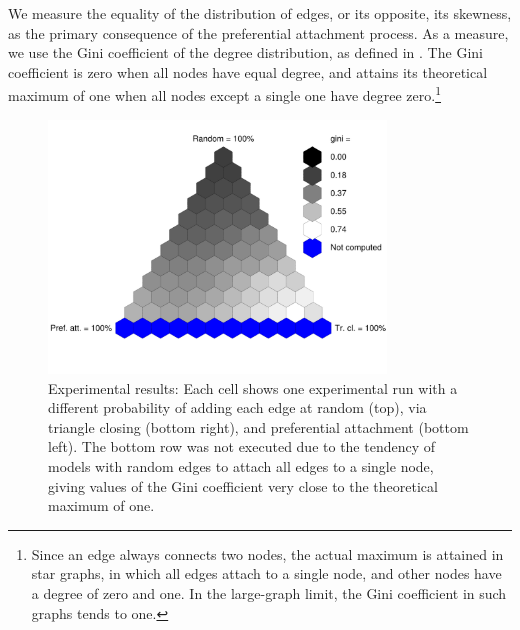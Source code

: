 \documentclass{jimis-final-en}
\begin{document}
We measure the equality of the distribution of edges, or its opposite,
its skewness, as the primary consequence of the preferential attachment
process.  As a measure, we use the Gini coefficient of the degree
distribution, as defined in \citep{kunegis:power-law}.  The Gini
coefficient is zero when all nodes have equal degree, and attains its
theoretical maximum of one when all nodes except a single one have
degree zero.\footnote{Since an edge always connects two nodes, the
  actual maximum is attained in star graphs, in which all edges 
  attach to a single node, and other nodes have a degree of zero and
  one.  In the large-graph limit, the Gini coefficient in such graphs
  tends to one.}  

\begin{figure}
  \includegraphics[width=0.8\textwidth]{simplex.gini.a}
  \caption{
    \label{fig:simplex-gini}
    Experimental results:  Each cell shows one experimental run with a
    different probability of adding each edge at random (top), via
    triangle closing (bottom right), and preferential attachment (bottom
    left).  The bottom row was not executed due to the tendency of
    models with random edges to attach all edges to a single node,
    giving values of the Gini coefficient very close to the theoretical
    maximum of one. 
  }
\end{figure}
\end{document}
